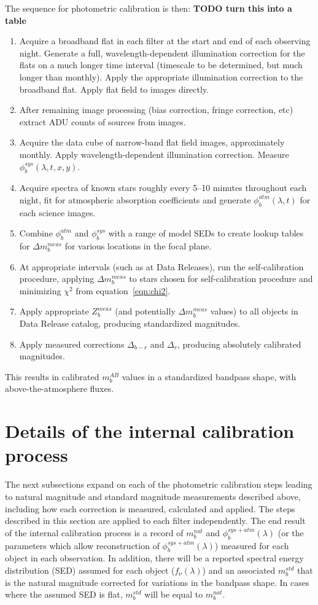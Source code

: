 \documentclass[12pt,preprint]{aastex}
\begin{document}
The sequence for photometric calibration is then:
{\bf TODO turn this into a table}
\begin{enumerate}
\item{Acquire a broadband flat in each filter at the start and end
of each observing night. Generate a full, wavelength-dependent
illumination correction for the flats on a much longer time interval
(timescale to be determined, but much longer than monthly). Apply
the appropriate illumination correction to the broadband flat. Apply
flat field to images directly.}
\item{After remaining image processing (bias correction, fringe
correction, etc) extract ADU counts of sources from images. }
\item{Acquire the data cube of narrow-band flat field images,
approximately monthly. Apply wavelength-dependent illumination
correction. Measure $\phi_b^{sys}(\lambda,t,x,y)$. }
\item{Acquire spectra of known stars roughly every 5--10 minutes
throughout each night, fit for atmospheric absorption coefficients and
generate $\phi_b^{atm}(\lambda,t)$ for each science images. }
\item{Combine $\phi_b^{atm}$ and $\phi_b^{sys}$ with a range of model
SEDs to create lookup tables for $\Delta m_b^{meas}$ for various
locations in the focal plane. }
\item{At appropriate intervals (such as at Data Releases), run the
self-calibration procedure, applying $\Delta m_b^{meas}$ to stars
chosen for self-calibration procedure and minimizing $\chi^2$ from
equation~\ref{eqn:chi2}.}
\item{Apply appropriate $Z_b^{meas}$ (and potentially $\Delta
m_b^{meas}$ values) to all objects in Data Release catalog, producing
standardized magnitudes.}
\item{Apply measured corrections $\Delta_{b-r}$ and $\Delta_r$,
producing absolutely calibrated magnitudes.}
\end{enumerate}
This results in calibrated $m_b^{AB}$ values in a standardized
bandpass shape, with above-the-atmosphere fluxes.

\section{Details of the internal calibration process}
\label{sec:calib_details}

The next subsections expand on each of the photometric calibration
steps leading to natural magnitude and standard magnitude measurements
described above, including how each correction is measured, calculated
and applied.  The steps described in this section are applied to each
filter independently. The end result of the internal calibration
process is a record of $m_b^{nat}$ and $\phi_b^{sys+atm}(\lambda)$ (or
the parameters which allow reconstruction of $\phi_b^{sys+atm}(\lambda)$)
measured for each object in each observation. In addition, there will
be a reported spectral energy distribution (SED) assumed for each
object ($f_\nu(\lambda)$) and an associated $m_b^{std}$ that is the
natural magnitude corrected for variations in the bandpass shape. In
cases where the assumed SED is flat, $m_b^{std}$ will be equal to
$m_b^{nat}$.
 
\end{document}
